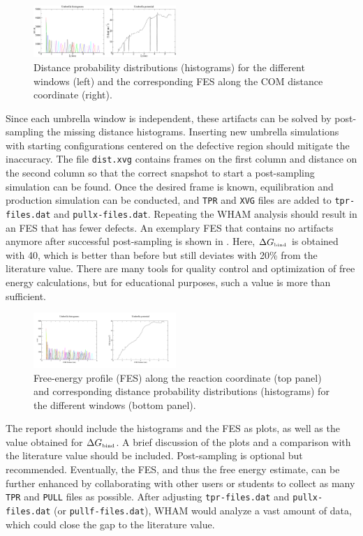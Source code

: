 \documentclass[9pt,tutorial]{livecoms}
\newcommand{\code}[1]{\colorbox{light-gray}{\texttt{#1}}}
\begin{document}
\begin{figure}[H]
    \centering
    \includegraphics[width=0.48\textwidth]{figures/expectedResults.pdf}
    \caption{Distance probability distributions (histograms) for the different windows (left) and the corresponding FES along the COM distance coordinate (right).}
    \label{fig:expectedResults}
\end{figure}
Since each umbrella window is independent, these artifacts can be solved by post-sampling the missing distance histograms. Inserting new umbrella simulations with starting configurations centered on the defective region should mitigate the inaccuracy. The file \code{dist.xvg} contains frames on the first column and distance on the second column so that the correct snapshot to start a post-sampling simulation can be found. Once the desired frame is known, equilibration and production simulation can be conducted, and \texttt{TPR} and \texttt{XVG} files are added to \code{tpr-files.dat} and \code{pullx-files.dat}. Repeating the WHAM analysis should result in an FES that has fewer defects. An exemplary FES that contains no artifacts anymore after successful post-sampling is shown in . Here, $\Delta G_\text{\tiny bind}$ is obtained with \SI{40}{\kcalm}, which is better than before but still deviates with 20\% from the literature value. There are many tools for quality control and optimization of free energy calculations\cite{Klimovich_2015}, but for educational purposes, such a value is more than sufficient.
\begin{figure}[H]
    \centering
    \includegraphics[width=0.48\textwidth]{figures/expectedResults_combined.pdf}
    \caption{Free-energy profile (FES) along the reaction coordinate {\textxi} (top panel) and corresponding distance probability distributions (histograms) for the different windows (bottom panel).}
    \label{fig:expectedResults_combined}
\end{figure}
The report should include the histograms and the FES as plots, as well as the value obtained for $\Delta G_\text{\tiny bind}$. A brief discussion of the plots and a comparison with the literature value should be included. Post-sampling is optional but recommended. Eventually, the FES, and thus the free energy estimate, can be further enhanced by collaborating with other users or students to collect as many \texttt{TPR} and \texttt{PULL} files as possible. After adjusting \code{tpr-files.dat} and \code{pullx-files.dat} (or \code{pullf-files.dat}), WHAM would analyze a vast amount of data, which could close the gap to the literature value.
\end{document}
